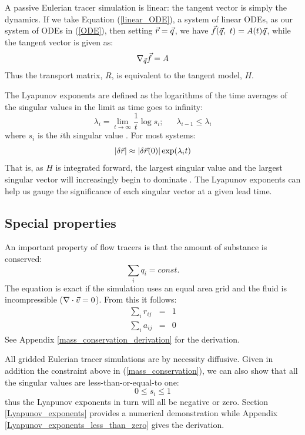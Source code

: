 A passive Eulerian tracer simulation is linear: the tangent vector is simply
the dynamics.
If we take Equation (\ref{linear_ODE}), a system of linear ODEs,
as our system of ODEs in
(\ref{ODE}), then setting $\vec r=\vec q$, 
we have $\vec f(\vec q, ~t)=A(t) \vec q$,
while the tangent vector is given as:
\begin{equation}
	\nabla_{\vec q} \vec f = A
\end{equation}
Thus the transport matrix, $R$, is equivalent to the tangent model, $H$.

The Lyapunov exponents are defined as the logarithms of the time averages
of the singular values in the limit as time goes to infinity:
\begin{equation}
\lambda_i = \lim_{t \rightarrow \infty} \frac{1}{t} \log s_i;
~~~~~~~\lambda_{i-1} \le \lambda_i
\end{equation}
where $s_i$ is the $i$th singular value \citep{Ott1993}.
For most systems:
\begin{equation}
|\delta \vec r| \approx |\delta \vec r(0) | \exp(\lambda_i t)
\label{lambda1}
\end{equation}
That is, as $H$ is integrated forward, the largest singular value and
the largest singular vector will increasingly begin to dominate
\citep{Ott1993}.
The Lyapunov exponents can help us gauge the significance of each
singular vector at a given lead time.

\subsection{Special properties}

An important property of flow tracers is that the amount of substance is 
conserved:
\begin{equation}
\sum_i q_i = const.
\label{mass_conservation}
\end{equation}
The equation is exact if the simulation uses an equal area grid
and the fluid is incompressible ($\nabla \cdot \vec v=0$).
From this it follows:
\begin{eqnarray}
\sum_i r_{ij} & = & 1 
\label{columns_sum_to_one}\\
\sum_i a_{ij} & = & 0
\label{columns_sum_to_zero}
\end{eqnarray}
See Appendix \ref{mass_conservation_derivation} for the derivation.

All gridded Eulerian tracer simulations are by necessity diffusive. 
Given in addition the constraint above in (\ref{mass_conservation}),
we can also show that all the singular values are less-than-or-equal-to one:
\begin{equation}
	0 \le s_i \le 1
	\label{sv_lt_one}
\end{equation}
thus the Lyapunov exponents in turn will all be negative or zero.
Section \ref{Lyapunov_exponents} provides a numerical demonstration while 
Appendix \ref{Lyapunov_exponents_less_than_zero} gives the derivation.

